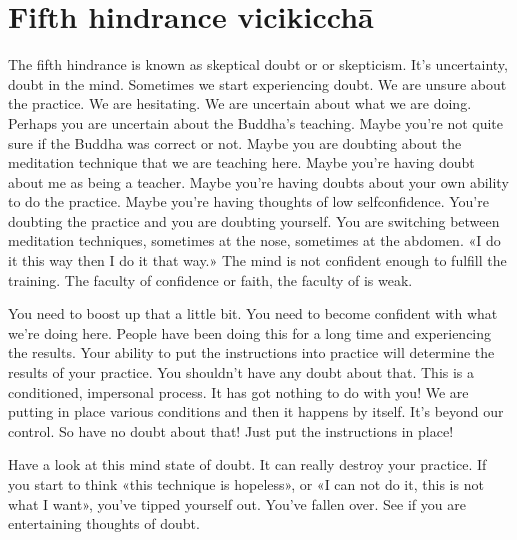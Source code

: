\documentclass[letterpaper,10pt,english]{sphinxmanual}
\begin{document}
\section{Fifth hindrance vicikicchā}
\label{\detokenize{3-a:fifth-hindrance-vicikiccha}}
\sphinxAtStartPar
The fifth hindrance is known as skeptical doubt or
or skepticism. It’s uncertainty, doubt in the mind. Sometimes we start experiencing
doubt. We are unsure about the practice. We are hesitating. We are uncertain
about  what  we  are  doing.  Perhaps  you  are  uncertain  about  the  Buddha’s
teaching.  Maybe  you’re  not  quite  sure  if  the  Buddha  was  correct  or  not.
Maybe you are doubting about the meditation technique that we are teaching here. Maybe you’re having doubt about me as being a teacher. Maybe
you’re having doubts about your own ability to do the practice. Maybe you’re
having thoughts of low self\sphinxhyphen{}confidence. You’re doubting the practice and you
are  doubting  yourself.  You  are  switching  between  meditation  techniques,
sometimes at the nose, sometimes at the abdomen. «I do it this way then I
do it that way.» The mind is not confident enough to fulfill the training. The
faculty of confidence or faith, the faculty of
is weak.

\sphinxAtStartPar
You  need  to  boost  up  that  a  little  bit. You  need  to  become  confident
with what we’re doing here. People have been doing this for a long time and
experiencing  the  results.  Your  ability  to  put  the  instructions  into  practice
will  determine  the  results  of  your  practice. You  shouldn’t  have  any  doubt
about that. This is a conditioned, impersonal process. It has got nothing to
do with you! We are putting in place various conditions and then it happens
by itself. It’s beyond our control. So have no doubt about that! Just put the
instructions in place!

\sphinxAtStartPar
Have a look at this mind state of doubt. It can really destroy your practice. If you start to think «this technique is hopeless», or «I can not do it, this
is not what I want», you’ve tipped yourself out. You’ve fallen over. See if
you are entertaining thoughts of doubt.
\end{document}

